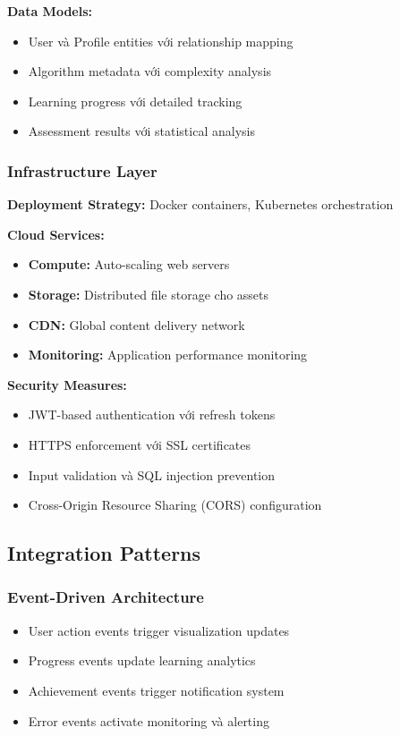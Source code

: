\textbf{Data Models:}
\begin{itemize}
    \item User và Profile entities với relationship mapping
    \item Algorithm metadata với complexity analysis
    \item Learning progress với detailed tracking
    \item Assessment results với statistical analysis
\end{itemize}

\subsubsection{Infrastructure Layer}
\textbf{Deployment Strategy:} Docker containers, Kubernetes orchestration

\textbf{Cloud Services:}
\begin{itemize}
    \item \textbf{Compute:} Auto-scaling web servers
    \item \textbf{Storage:} Distributed file storage cho assets
    \item \textbf{CDN:} Global content delivery network
    \item \textbf{Monitoring:} Application performance monitoring
\end{itemize}

\textbf{Security Measures:}
\begin{itemize}
    \item JWT-based authentication với refresh tokens
    \item HTTPS enforcement với SSL certificates
    \item Input validation và SQL injection prevention
    \item Cross-Origin Resource Sharing (CORS) configuration
\end{itemize}

\subsection{Integration Patterns}

\subsubsection{Event-Driven Architecture}
\begin{itemize}
    \item User action events trigger visualization updates
    \item Progress events update learning analytics
    \item Achievement events trigger notification system
    \item Error events activate monitoring và alerting
\end{itemize}

